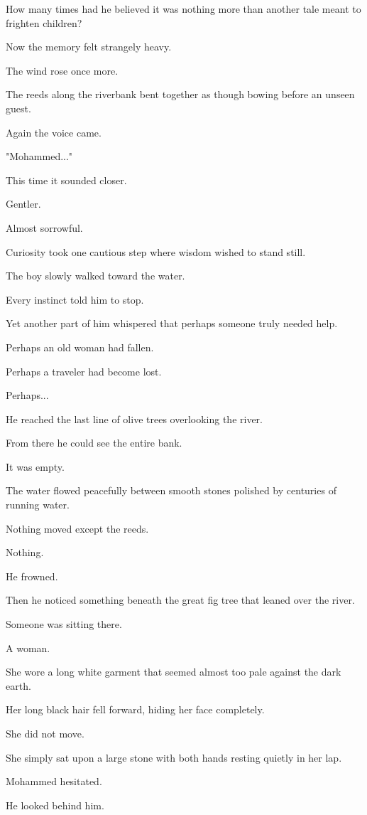 \documentclass[12pt,openany]{book}
\begin{document}
How many times had he believed it was nothing more than another tale meant to frighten children?

Now the memory felt strangely heavy.

The wind rose once more.

The reeds along the riverbank bent together as though bowing before an unseen guest.

Again the voice came.

"Mohammed..."

This time it sounded closer.

Gentler.

Almost sorrowful.

Curiosity took one cautious step where wisdom wished to stand still.

The boy slowly walked toward the water.

Every instinct told him to stop.

Yet another part of him whispered that perhaps someone truly needed help.

Perhaps an old woman had fallen.

Perhaps a traveler had become lost.

Perhaps...

He reached the last line of olive trees overlooking the river.

From there he could see the entire bank.

It was empty.

The water flowed peacefully between smooth stones polished by centuries of running water.

Nothing moved except the reeds.

Nothing.

He frowned.

Then he noticed something beneath the great fig tree that leaned over the river.

Someone was sitting there.

A woman.

She wore a long white garment that seemed almost too pale against the dark earth.

Her long black hair fell forward, hiding her face completely.

She did not move.

She simply sat upon a large stone with both hands resting quietly in her lap.

Mohammed hesitated.

He looked behind him.
\end{document}
